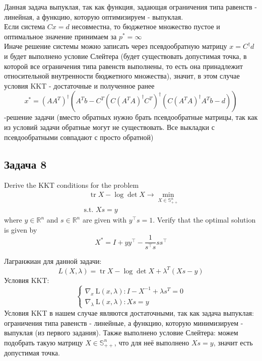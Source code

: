 \documentclass[a4paper,12pt]{article} %
\begin{document}
Данная задача выпуклая, так как функция, задающая ограничения типа равенств - линейная, а функцию, которую оптимизируем - выпуклая.\\
Если система $ Cx = d $ несовместна, то бюджетное множество пустое и оптимальное значение принимаем за $ p^* = \infty $\\
Иначе решение системы можно записать через псевдообратную матрицу $ x = C^{\dagger} d $ и будет выполнено условие Слейтера (будет существовать допустимая точка, в которой все ограничения типа равенств выполнены, то есть она принадлежит относительной внутренности бюджетного множества), значит, в этом случае условия KKT - достаточные и полученное ранее 
$$
x^*=\left(A A^{T}\right)^{\dagger}\left( A^{T} b-C^{T} \left(C\left(A^{T} A\right)^{\dagger} C^{T}\right)^{\dagger}\left(C\left(A^{T} A\right)^{\dagger} A^{T} b-d\right)\right)
$$
-решение задачи (вместо обратных нужно брать псевдообратные матрицы, так как из условий задачи обратные могут не существовать. Все выкладки с псевдообратными совпадают с просто обратной)


\subsection*{Задача 8}
Derive the KKT conditions for the problem
$$
\begin{array}{l}
\quad \operatorname{tr} X-\log \operatorname{det} X \rightarrow \min\limits _{X \in \mathbb{S}_{++}^{n}} \\
\text { s.t. } X s=y
\end{array}
$$
where $y \in \mathbb{R}^{n}$ and $s \in \mathbb{R}^{n}$ are given with $y^{\top} s=1$. Verify that the optimal solution is given by
$$
X^{*}=I+y y^{\top}-\frac{1}{s^{\top} s} s s^{\top}
$$

Лагранжиан для данной задачи:
$$
L(X, \lambda)=\operatorname{tr} X-\log \operatorname{det} X+\lambda^{T}(X s-y)
$$
Условия KKT:
$$
\left\{\begin{array}{l}
\nabla_{x} \mathrm{~L}(x, \lambda): I-X^{-1}+\lambda s^{T}=0 \\
\nabla_{\lambda} \mathrm{~L}(x, \lambda): X s=y
\end{array}\right.
$$
Условия KKT в нашем случае являются достаточными, так как задача выпуклая: ограничения типа равенств - линейные, а функцию, которую минимизируем - выпуклая (из первого задания). Также выполнено условие Слейтера: можем подобрать такую матрицу  $ X \in \mathbb{S}_{++}^{n} $, что для неё выполнено $ X s=y $, значит есть допустимая точка. \\
\end{document}
